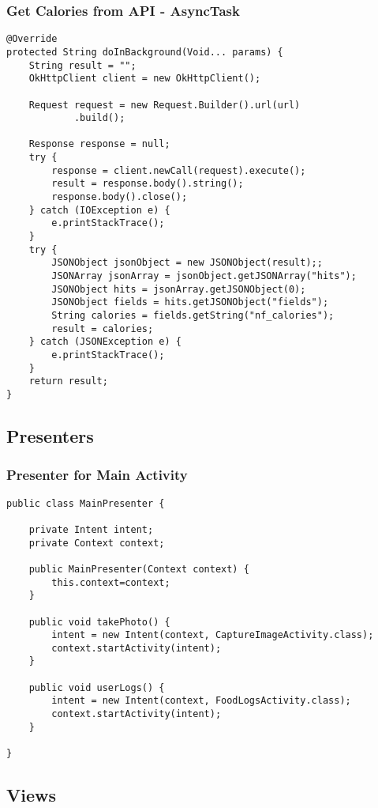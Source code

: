 \subsubsection*{Get Calories from API - AsyncTask}
\begin{lstlisting}[style=Java]
@Override
protected String doInBackground(Void... params) {
    String result = "";
    OkHttpClient client = new OkHttpClient();

    Request request = new Request.Builder().url(url)
            .build();

    Response response = null;
    try {
        response = client.newCall(request).execute();
        result = response.body().string();
        response.body().close();
    } catch (IOException e) {
        e.printStackTrace();
    }
    try {
        JSONObject jsonObject = new JSONObject(result);;
        JSONArray jsonArray = jsonObject.getJSONArray("hits");
        JSONObject hits = jsonArray.getJSONObject(0);
        JSONObject fields = hits.getJSONObject("fields");
        String calories = fields.getString("nf_calories");
        result = calories;
    } catch (JSONException e) {
        e.printStackTrace();
    }
    return result;
}
\end{lstlisting}

\subsection*{Presenters}
\subsubsection*{Presenter for Main Activity}
\begin{lstlisting}[style=Java]
public class MainPresenter {

    private Intent intent;
    private Context context;

    public MainPresenter(Context context) {
        this.context=context;
    }

    public void takePhoto() {
        intent = new Intent(context, CaptureImageActivity.class);
        context.startActivity(intent);
    }

    public void userLogs() {
        intent = new Intent(context, FoodLogsActivity.class);
        context.startActivity(intent);
    }

}
\end{lstlisting}

\subsection*{Views}
